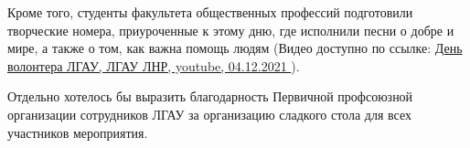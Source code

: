 Кроме того, студенты факультета общественных профессий подготовили творческие
номера, приуроченные к этому дню, где исполнили песни о добре и мире, а также о
том, как важна помощь людям (Видео доступно по ссылке:
\href{https://www.youtube.com/watch?v=cmIQQcDz4us}{%
День волонтера ЛГАУ, ЛГАУ ЛНР, youtube, 04.12.2021%
}).

Отдельно хотелось бы выразить благодарность Первичной профсоюзной организации
сотрудников ЛГАУ за организацию сладкого стола для всех участников мероприятия.	




